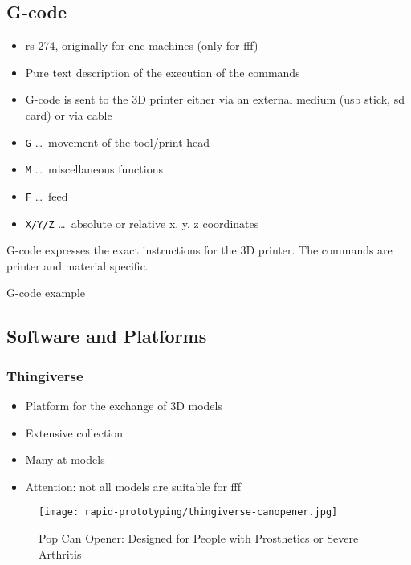 \documentclass[aspectratio=169]{beamer}
\begin{document}
\subsection{G-code}
\begin{frame}
    \begin{itemize}
        \item \acs{rs}-274, originally for \acs{cnc} machines (only for \acs{fff})
        \item Pure text description of the execution of the commands
        \item G-code is sent to the 3D printer either via an external medium (\acs{usb} stick, \acs{sd} card) or via cable
        \item \texttt{G} \ldots\, movement of the tool/print head
        \item \texttt{M} \ldots\, miscellaneous functions
        \item \texttt{F} \ldots\, feed
        \item \texttt{X/Y/Z} \ldots\, absolute or relative x, y, z coordinates
    \end{itemize}
    \begin{exampleblock}{}
        G-code expresses the exact instructions for the 3D printer.
        The commands are printer and material specific.
    \end{exampleblock}
\end{frame}

\begin{frame}
    \begin{listing}[H]
        \caption{G-code example}
        \label{lst:gcode:example}
    \end{listing}
\end{frame}

\subsection{Software and Platforms}

\subsubsection{Thingiverse}
\begin{frame}
    \begin{itemize}
        \item Platform for the exchange of 3D models
        \item Extensive collection
        \item Many \acs{at} models
        \item Attention: not all models are suitable for \acs{fff}
    \end{itemize}
    \begin{figure}
        \texttt{[image: rapid-prototyping/thingiverse-canopener.jpg]}
        \caption{Pop Can Opener: Designed for People with Prosthetics or Severe Arthritis}
    \end{figure}
\end{frame}
\end{document}
